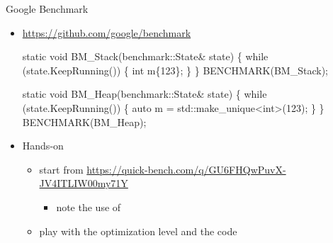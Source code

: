 \begin{frame}[fragile]{Google Benchmark}

  \begin{itemize}
  \item \url{https://github.com/google/benchmark}
    \begin{codeblock}
static void BM_Stack(benchmark::State& state) \{
  while (state.KeepRunning()) \{
    int m\{123\};
  \}
\}
BENCHMARK(BM_Stack);

static void BM_Heap(benchmark::State& state) \{
  while (state.KeepRunning()) \{
    auto m = std::make_unique<int>(123);
  \}
\}
BENCHMARK(BM_Heap);
  \end{codeblock}

  \item Hands-on
    \begin{itemize}
    \item start from {\footnotesize\url{https://quick-bench.com/q/GU6FHQwPuvX-JV4ITLIW00my71Y}}
      \begin{itemize}
      \item note the use of 
      \end{itemize}
    \item play with the optimization level and the code
    \end{itemize}

  \end{itemize}

\end{frame}


